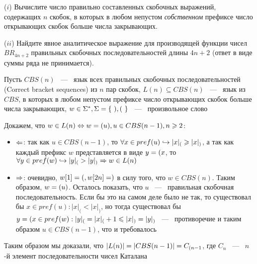 \documentclass[a4paper,12pt]{article}
\begin{document}
\begin{tasknum}{4}
	($i$) Вычислите число правильно составленных скобочных выражений, содержащих $n$ скобок, в которых в любом непустом \textit{собственном} префиксе число открывающих скобок больше числа закрывающих.
	
	($ii$) Найдите явное аналитическое выражение для производящей функции чисел $BR_{4n+2}$ правильных скобочных последовательностей длины $4n+2$ (ответ в виде суммы ряда не принимается). 
\end{tasknum}

\begin{solution}
	
	Пусть $CBS(n)$ ~---~ язык всех правильных скобочных последовательностей (Correct bracket sequences) из $n$ пар скобок, $L(n) \subseteq CBS(n)$ ~---~ язык из $CBS$, в которых в любом непустом префиксе число открывающих скобок больше числа закрывающих, $w \in \Sigma^*, \Sigma \hm{=} \{ \ ), ( \ \}$ ~---~ произвольное слово
		
		Докажем, что $w \in L(n) \LRa w \hm{=} (u), u \in CBS(n-1), n \ge 2$:
		
		\begin{itemize}
			\item $\Leftarrow$: так как $u \in CBS(n-1)$, то $\forall x \in pref(u) \hookrightarrow |x|_( \geqslant |x|_)$, а так как каждый префикс $w$ представляется в виде $y \hm{=} (x$, то $\forall y \in pref(w) \hookrightarrow |y|_( > |y|_) \Rightarrow w \in L(n)$
			\item $\Rightarrow$: очевидно, $w[1] \hm{=} (, w[2n] \hm{=} )$ в силу того, что $w \in CBS(n)$.		
			Таким образом, $w \hm{=} (u)$. Осталось показать, что $u$ ~---~ правильная скобочная последовательность. Если бы это на самом деле было не так, то существовал бы $x \in pref(u) : |x|_( < |x|_)$, но тогда существовал бы $y \hm{=} (x \in pref(w) : |y|_( \hm{=} |x|_( + 1 \le |x|_) \hm{=} |y|_)$ ~---~ противоречие и таким образом $u \in CBS(n-1)$, что и требовалось
			
		\end{itemize}
		
		Таким образом мы доказали, что $|L(n)| \hm{=} |CBS(n-1)| \hm{=} C_{(n-1}$, где $C_n$ ~---~ $n$-й элемент последовательности чисел Каталана
	
\end{solution}
\end{document}
